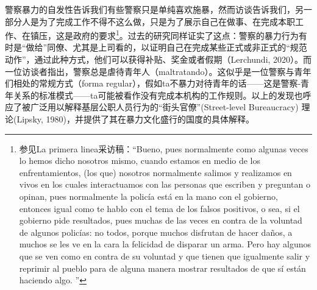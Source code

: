 \documentclass{phyasgn}\usepackage{nag}
\begin{document}
\par 警察暴力的自发性告诉我们有些警察只是单纯喜欢施暴，然而访谈告诉我们，另一部分人是为了完成工作不得不这么做，只是为了展示自己在做事、在完成本职工作、在镇压，这是政府的要求\footnote[81]{参见La primera linea采访稿：“Bueno, pues normalmente como algunas veces lo hemos dicho nosotros mismo, cuando estamos en medio de los enfrentamientos, (los que) nosotros normalmente salimos y realizamos en vivos en los cuales interactuamos con las personas que escriben y preguntan o opinan, pues normalmente la policía está en la mano con el gobierno, entonces igual como te hablo con el tema de los falsos positivos, o sea, si el gobierno pide resultados, pues muchas de las veces en contra de la voluntad de algunos policías: no todos, porque muchos disfrutan de hacer daños, a muchos se les ve en la cara la felicidad de disparar un arma. Pero hay algunos que se ven como en contra de su voluntad y que tienen que igualmente salir y reprimir al pueblo para de alguna manera mostrar resultados de que sí están haciendo algo. ”}。过去的研究同样证实了这点：警察的暴力行为有时是“做给”同僚、尤其是上司看的，以证明自己在完成某些正式或非正式的“规范动作”，通过此种方式，他们可以获得补贴、奖金或者假期（Lerchundi, 2020）。而一位访谈者指出，警察总是虐待青年人（maltratando）。这似乎是一位警察与青年们相处的常规方式（forma regular），假如ta不暴力对待青年的话——这是警察-青年关系的标准模式——ta可能被看作没有完成本机构的工作规则。以上的发现也呼应了被广泛用以解释基层公职人员行为的“街头官僚”(Street-level Bureaucracy) 理论(Lipsky, 1980)，并提供了其在暴力文化盛行的国度的具体解释。
\end{document}
